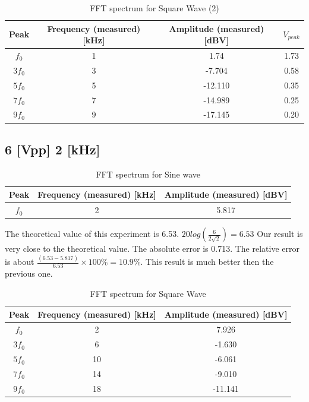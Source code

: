 \documentclass{article}
\begin{document}
\begin{table}[H]
	\centering
	\begin{tabular}{|c|c|c|c|}
		\hline 
		Peak& Frequency (measured) [kHz] & Amplitude (measured) [dBV] &$V_{peak}$\\ 
		\hline 
		$f_0$& 1 & 1.74 &1.73\\ 
		\hline 
		$3f_0$& 3 & -7.704&0.58 \\ 
		\hline 
		$5f_0$& 5 & -12.110&0.35 \\ 
		\hline 
		$7f_0$& 7 & -14.989&0.25\\
		\hline 
		$9f_0$& 9 & -17.145 &0.20\\ 
		\hline 
	\end{tabular} 
	\caption{FFT spectrum for Square Wave (2)}
\end{table}
\subsection{6 [Vpp] 2 [kHz]}
	\begin{table}[H]
		\centering
		\begin{tabular}{|c|c|c|}
			\hline 
			Peak& Frequency (measured) [kHz] & Amplitude (measured) [dBV] \\ 
			\hline 
			$f_0$&2  & 5.817 \\ 
			\hline 
		\end{tabular} 
		\caption{FFT spectrum for Sine wave}
	\end{table}
The theoretical value of this experiment is 6.53. $20log(\frac{6}{2\sqrt{2}})=6.53$ Our result is very close to the theoretical value. The absolute error is 0.713. The relative error is about $\frac{(6.53-5.817)}{6.53}\times 100\%=10.9\%$. This result is much better then the previous one.
	\begin{table}[H]
		\centering
		\begin{tabular}{|c|c|c|}
			\hline 
			Peak& Frequency (measured) [kHz] & Amplitude (measured) [dBV] \\ 
			\hline 
			$f_0$& 2 & 7.926 \\ 
			\hline 
			$3f_0$& 6 & -1.630 \\ 
			\hline 
			$5f_0$& 10 & -6.061 \\ 
			\hline 
			$7f_0$& 14 & -9.010 \\ 
			\hline 
			$9f_0$& 18 & -11.141 \\ 
			\hline 
		\end{tabular} 
		\caption{FFT spectrum for Square Wave}
	\end{table}
\end{document}

